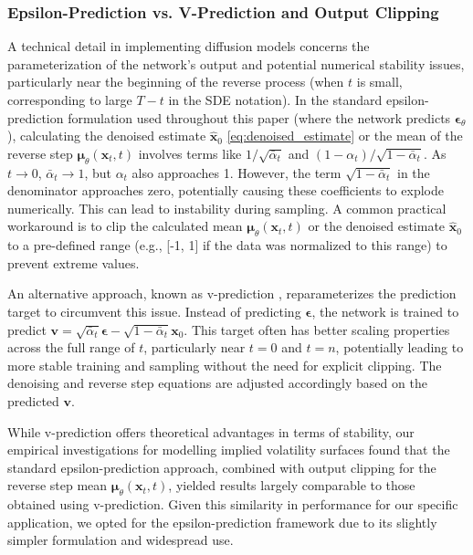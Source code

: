 \documentclass{article}
\begin{document}
\subsubsection{Epsilon-Prediction vs. V-Prediction and Output Clipping}
A technical detail in implementing diffusion models concerns the parameterization of the network's output and potential numerical stability issues, particularly near the beginning of the reverse process (when $t$ is small, corresponding to large $T-t$ in the SDE notation). In the standard epsilon-prediction formulation used throughout this paper (where the network predicts $\boldsymbol{\epsilon}_\theta$), calculating the denoised estimate $\hat{\mathbf{x}}_0$ \eqref{eq:denoised_estimate} or the mean of the reverse step $\boldsymbol{\mu}_\theta(\mathbf{x}_t, t)$ involves terms like $1/\sqrt{\bar{\alpha}_t}$ and $(1-\alpha_t)/\sqrt{1-\bar{\alpha}_t}$. As $t \to 0$, $\bar{\alpha}_t \to 1$, but $\alpha_t$ also approaches 1. However, the term $\sqrt{1-\bar{\alpha}_t}$ in the denominator approaches zero, potentially causing these coefficients to explode numerically. This can lead to instability during sampling. A common practical workaround is to clip the calculated mean $\boldsymbol{\mu}_\theta(\mathbf{x}_t, t)$ or the denoised estimate $\hat{\mathbf{x}}_0$ to a pre-defined range (e.g., [-1, 1] if the data was normalized to this range) to prevent extreme values.

An alternative approach, known as v-prediction \citep{Salimans_Ho_2022}, reparameterizes the prediction target to circumvent this issue. Instead of predicting $\boldsymbol{\epsilon}$, the network is trained to predict $\mathbf{v} = \sqrt{\bar{\alpha}_t} \boldsymbol{\epsilon} - \sqrt{1-\bar{\alpha}_t} \mathbf{x}_0$. This target often has better scaling properties across the full range of $t$, particularly near $t=0$ and $t=n$, potentially leading to more stable training and sampling without the need for explicit clipping. The denoising and reverse step equations are adjusted accordingly based on the predicted $\mathbf{v}$.

While v-prediction offers theoretical advantages in terms of stability, our empirical investigations for modelling implied volatility surfaces found that the standard epsilon-prediction approach, combined with output clipping for the reverse step mean $\boldsymbol{\mu}_\theta(\mathbf{x}_t, t)$, yielded results largely comparable to those obtained using v-prediction. Given this similarity in performance for our specific application, we opted for the epsilon-prediction framework due to its slightly simpler formulation and widespread use.
\end{document}
